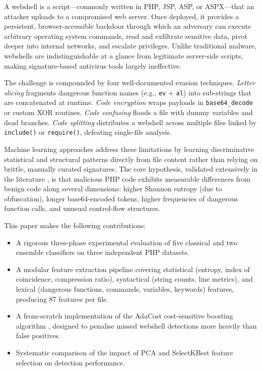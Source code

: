 \documentclass[journal,twocolumn]{IEEEtran}
\begin{document}
A webshell is a script---commonly written in PHP, JSP, ASP, or ASPX---that an attacker uploads to a compromised web server. Once deployed, it provides a persistent, browser-accessible backdoor through which an adversary can execute arbitrary operating system commands, read and exfiltrate sensitive data, pivot deeper into internal networks, and escalate privileges. Unlike traditional malware, webshells are indistinguishable at a glance from legitimate server-side scripts, making signature-based antivirus tools largely ineffective.

The challenge is compounded by four well-documented evasion techniques. \textit{Letter slicing} fragments dangerous function names (e.g., \texttt{ev} $+$ \texttt{al}) into sub-strings that are concatenated at runtime. \textit{Code encryption} wraps payloads in \texttt{base64\_decode} or custom XOR routines. \textit{Code confusing} floods a file with dummy variables and dead branches. \textit{Code splitting} distributes a webshell across multiple files linked by \texttt{include()} or \texttt{require()}, defeating single-file analysis.

Machine learning approaches address these limitations by learning discriminative statistical and structural patterns directly from file content rather than relying on brittle, manually curated signatures. The core hypothesis, validated extensively in the literature \cite{wang2012detecting,wang2015detecting}, is that malicious PHP code exhibits measurable differences from benign code along several dimensions: higher Shannon entropy (due to obfuscation), longer base64-encoded tokens, higher frequencies of dangerous function calls, and unusual control-flow structures.

This paper makes the following contributions:
\begin{itemize}
  \item A rigorous three-phase experimental evaluation of five classical and two ensemble classifiers on three independent PHP datasets.
  \item A modular feature extraction pipeline covering statistical (entropy, index of coincidence, compression ratio), syntactical (string counts, line metrics), and lexical (dangerous functions, commands, variables, keywords) features, producing 87 features per file.
  \item A from-scratch implementation of the AdaCost cost-sensitive boosting algorithm \cite{fan1999adacost}, designed to penalise missed webshell detections more heavily than false positives.
  \item Systematic comparison of the impact of PCA and SelectKBest feature selection on detection performance.
\end{itemize}
\end{document}
